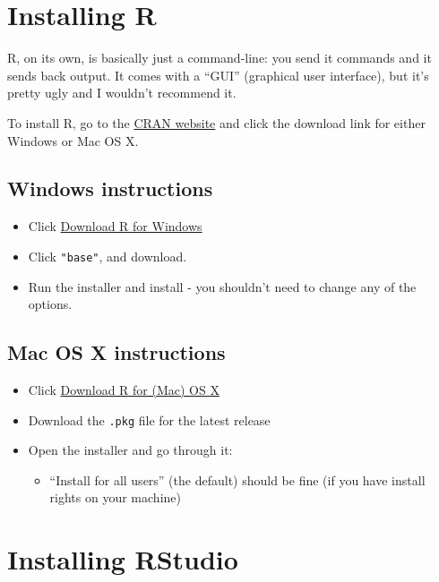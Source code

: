 \documentclass[
]{book}
\providecommand{\tightlist}{%
  \setlength{\itemsep}{0pt}\setlength{\parskip}{0pt}}
\begin{document}
\hypertarget{installing-r}{%
\section{Installing R}\label{installing-r}}

R, on its own, is basically just a command-line: you send it commands
and it sends back output. It comes with a ``GUI'' (graphical user
interface), but it's pretty ugly and I wouldn't recommend it.

To install R, go to the \href{https://cran.rstudio.com/}{CRAN website} and
click the download link for either Windows or Mac OS X.

\hypertarget{windows-instructions}{%
\subsection{Windows instructions}\label{windows-instructions}}

\begin{itemize}
\tightlist
\item
  Click \href{https://cran.r-project.org/bin/windows/}{Download R for Windows}
\item
  Click \texttt{"base"}, and download.
\item
  Run the installer and install - you shouldn't need to change any
  of the options.
\end{itemize}

\hypertarget{mac-os-x-instructions}{%
\subsection{Mac OS X instructions}\label{mac-os-x-instructions}}

\begin{itemize}
\tightlist
\item
  Click \href{https://cran.r-project.org/bin/macosx/}{Download R for (Mac) OS X}
\item
  Download the \texttt{.pkg} file for the latest release
\item
  Open the installer and go through it:

  \begin{itemize}
  \tightlist
  \item
    ``Install for all users'' (the default) should be fine (if you have
    install rights on your machine)
  \end{itemize}
\end{itemize}

\hypertarget{installing-rstudio}{%
\section{Installing RStudio}\label{installing-rstudio}}
\end{document}
